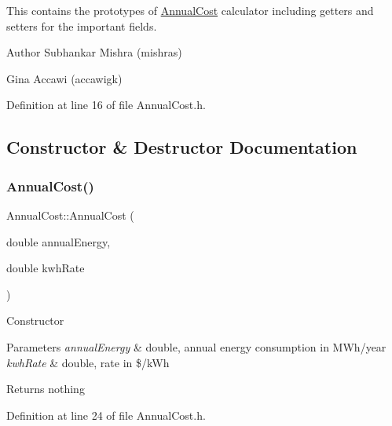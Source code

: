 This contains the prototypes of \hyperlink{class_annual_cost}{Annual\+Cost} calculator including getters and setters for the important fields.

\begin{DoxyAuthor}{Author}
Subhankar Mishra (mishras) 

Gina Accawi (accawigk) 
\end{DoxyAuthor}


Definition at line 16 of file Annual\+Cost.\+h.



\subsection{Constructor \& Destructor Documentation}
\mbox{\label{class_annual_cost_a723513a7074d1799e2bf410b60b3146f}} 
\subsubsection{\texorpdfstring{Annual\+Cost()}{AnnualCost()}\hspace{0.1cm}{\footnotesize\ttfamily [1/3]}}
{\footnotesize\ttfamily Annual\+Cost\+::\+Annual\+Cost (\begin{DoxyParamCaption}\item[{double}]{annual\+Energy,  }\item[{double}]{kwh\+Rate }\end{DoxyParamCaption})\hspace{0.3cm}{\ttfamily [inline]}}

Constructor 
\begin{DoxyParams}{Parameters}
{\em annual\+Energy} & double, annual energy consumption in M\+Wh/year \\
\hline
{\em kwh\+Rate} & double, rate in \$/k\+Wh \\
\hline
\end{DoxyParams}
\begin{DoxyReturn}{Returns}
nothing 
\end{DoxyReturn}


Definition at line 24 of file Annual\+Cost.\+h.

\mbox{\label{class_annual_cost_a723513a7074d1799e2bf410b60b3146f}} 
